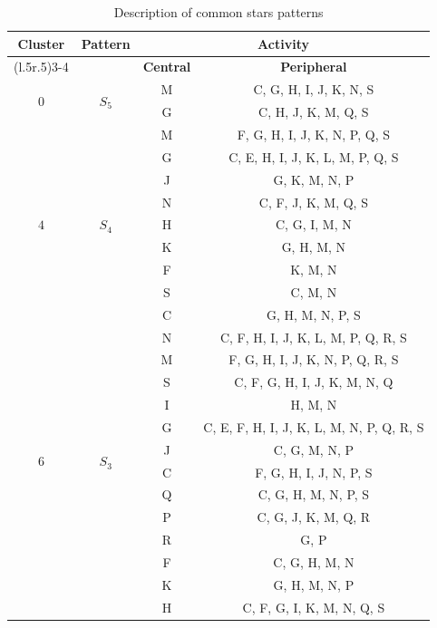 \documentclass[12pt]{article}
\newcommand\vcenterhead[2]
  {%
    \multirow{#2}{*}[-0.5\dimexpr\aboverulesep+\belowrulesep+\cmidrulewidth\relax]{#1}%
  }
\begin{document}
\begin{table}[H]
\addtolength{\tabcolsep}{-2pt}
\centering
\vspace{3mm}
\begin{tabular}{cccc}
\textbf{Cluster} & \textbf{Pattern} & \multicolumn{2}{c}{\textbf{Activity}}\\
\cmidrule(l{.5\tabcolsep}r{.5\tabcolsep}){3-4}
& & \textbf{Central} & \textbf{Peripheral} \\
\hline
\vcenterhead{$0$}{2} & \vcenterhead{$S_{5}$}{2} & M & C, G, H, I, J, K, N, S \\
 &  & G & C, H, J, K, M, Q, S\\
\hline
\vcenterhead{$4$}{9} & \vcenterhead{$S_{4}$}{9} & M & F, G, H, I, J, K, N, P, Q, S\\
&  & G & C, E, H, I, J, K, L, M, P, Q, S\\
&  & J & G, K, M, N, P\\
&  & N & C, F, J, K, M, Q, S \\
&  & H & C, G, I, M, N \\
&  & K & G, H, M, N \\
&  & F & K, M, N \\
&  & S & C, M, N \\
&  & C & G, H, M, N, P, S\\
\hline

\vcenterhead{$6$}{12} & \vcenterhead{$S_{3}$}{12} & N & C, F, H, I, J, K, L, M, P, Q, R, S\\
&  & M & F, G, H, I, J, K, N, P, Q, R, S\\
&  & S & C, F, G, H, I, J, K, M, N, Q\\
&  & I & H, M, N\\
&  & G & C, E, F, H, I, J, K, L, M, N, P, Q, R, S\\
&  & J & C, G, M, N, P\\
&  & C & F, G, H, I, J, N, P, S\\
&  & Q & C, G, H, M, N, P, S\\
&  & P & C, G, J, K, M, Q, R\\
&  & R & G, P\\
&  & F & C, G, H, M, N\\
&  & K & G, H, M, N, P\\
&  & H & C, F, G, I, K, M, N, Q, S\\
\hline
\hline
\end{tabular}
\caption{Description of common stars patterns}
\label{tab:patter046}
\end{table}
\end{document}
